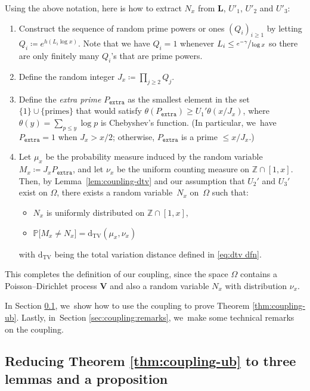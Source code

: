 \documentclass[JEP,XML,SOM,Unicode,published]{cedram}
\newcommand{\bL}{{\boldsymbol L}}
\newcommand{\bV}{{\boldsymbol V}}
\newcommand{\ZZ}{\mathbb{Z}}
\newcommand{\PP}{\mathbb{P}}
\newcommand{\dtv}{\mathrm{d}_{\mathrm{TV}}}
\newcommand{\pextra}{P_{\mathtt{extra}}}
\newcommand{\bg}{\big}
\theoremstyle{plain}
\theoremstyle{definition}
\begin{document}
Using the above notation, here is how to extract $N_x$ from $\bL$, $U'_1$, $U'_2$ and $U'_3$:
\begin{enumerate}
\item\label{step:1} Construct the sequence of random prime powers or ones $(Q_i)_{i \ge 1}$ by letting $Q_i \coloneqq e^{h(L_i\log x)}$. Note that we have $Q_i = 1$ whenever $L_i \le \sfrac{e^{-\gamma}}{\log x}$ so there are only finitely many $Q_i$'s that are prime powers.

\item\label{step:2} Define the random integer $J_x \coloneqq \prod_{j \ge 2} Q_j$.

\item\label{step:3} Define the \emph{extra prime} $\pextra$ as the smallest element in the set $\{1\}\cup\{\text{primes}\}$ that would satisfy $\theta(\pextra)\ge U_1'\theta(x/J_x)$, where $\theta(y)=\sum_{p\le y}\log p$ is Chebyshev's function. (In particular, we~have $\pextra=1$ when $J_x>x/2$; otherwise, $\pextra$ is a prime $\le x/J_x$.)

\item\label{step:4} Let $\mu_x$ be the probability measure induced by the random variable $M_x\coloneqq J_x\pextra$, and let $\nu_x$ be the uniform counting measure on $\ZZ\cap[1,x]$. Then, by Lemma~\ref{lem:coupling-dtv} and our assumption that $U_2'$ and $U_3'$ exist on $\Omega$, there exists a random variable~$N_x$ on~$\Omega$ such that:

\begin{itemize}
\item $N_x$ is uniformly distributed on $\ZZ\cap[1,x]$,
\item $\PP\bg[M_x\neq N_x\bg]=\dtv(\mu_x,\nu_x)$
\end{itemize}
with $\dtv$ being the total variation distance defined in \eqref{eq:dtv dfn}.
\end{enumerate}

This completes the definition of our coupling, since the space $\Omega$ contains a Poisson--Dirichlet process $\bV$ and also a random variable $N_x$ with distribution $\nu_x$.

In Section \ref{sec:coupling:reduction}, we~show how to use the coupling to prove Theorem \ref{thm:coupling-ub}. Lastly, in~Section \ref{sec:coupling:remarks}, we~make some technical remarks on the coupling.

\subsection{Reducing Theorem \ref{thm:coupling-ub} to three lemmas and a proposition}\label{sec:coupling:reduction}
\end{document}
